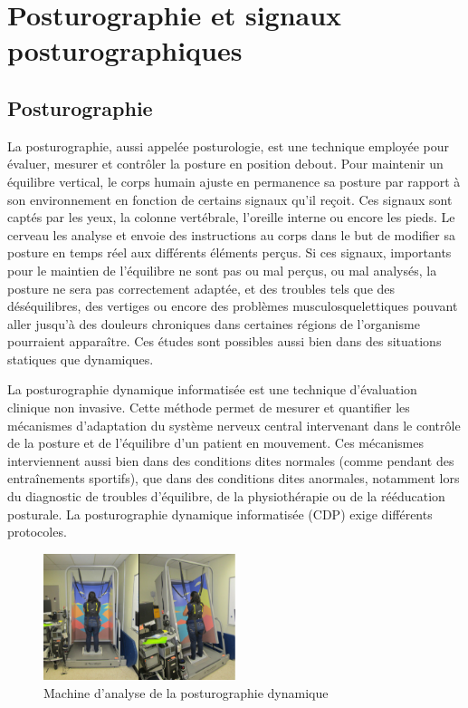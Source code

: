 \section{Posturographie et signaux posturographiques }

\subsection{Posturographie}

La posturographie, aussi appelée posturologie, est une technique employée pour évaluer, mesurer et contrôler la posture en position debout. 
Pour maintenir un équilibre vertical, le corps humain ajuste en permanence sa posture par rapport à son environnement en fonction de certains signaux qu'il reçoit. 
Ces signaux sont captés par les yeux, la colonne vertébrale, l’oreille interne ou encore les pieds. 
Le cerveau les analyse et envoie des instructions au corps dans le but de modifier sa posture en temps réel aux différents éléments perçus. 
Si ces signaux, importants pour le maintien de l'équilibre ne sont pas ou mal perçus, ou mal analysés, la posture ne sera pas correctement adaptée, et des troubles tels que des déséquilibres, des vertiges ou encore des problèmes musculosquelettiques pouvant aller jusqu'à des douleurs chroniques dans certaines régions de l’organisme pourraient apparaître.
Ces études sont possibles aussi bien dans des situations statiques que dynamiques.



La posturographie dynamique informatisée est une technique d'évaluation clinique non invasive. 
Cette méthode permet de mesurer et quantifier les mécanismes d’adaptation du système nerveux central intervenant dans le contrôle de la posture et de l'équilibre d’un patient en mouvement. 
Ces mécanismes interviennent aussi bien dans des conditions dites normales (comme pendant des entraînements sportifs), que dans des conditions dites anormales, notamment lors du diagnostic de troubles d'équilibre, de la physiothérapie ou de la rééducation posturale. 
La posturographie dynamique informatisée (CDP) exige différents protocoles.


\begin{figure}[H]
  \centering
  \includegraphics[width=0.5\textwidth]{images/introduction/dynamique.png}
  \caption{Machine d’analyse de la posturographie dynamique }
  \label{fig:posturographie-dynamique}
\end{figure}

